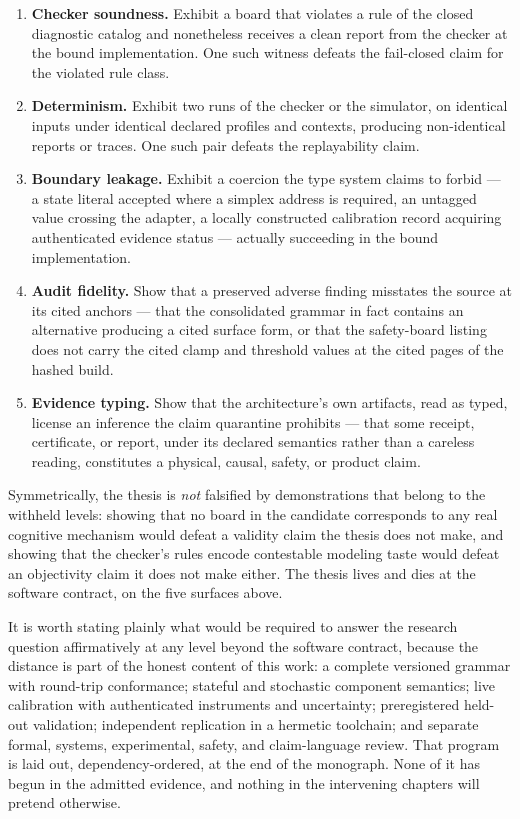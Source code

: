 \begin{enumerate}
\item \textbf{Checker soundness.} Exhibit a board that violates a rule of
the closed diagnostic catalog and nonetheless receives a clean report
from the checker at the bound implementation. One such witness defeats
the fail-closed claim for the violated rule class.
\item \textbf{Determinism.} Exhibit two runs of the checker or the
simulator, on identical inputs under identical declared profiles and
contexts, producing non-identical reports or traces. One such pair
defeats the replayability claim.
\item \textbf{Boundary leakage.} Exhibit a coercion the type system
claims to forbid --- a state literal accepted where a simplex address is
required, an untagged value crossing the adapter, a locally constructed
calibration record acquiring authenticated evidence status --- actually
succeeding in the bound implementation.
\item \textbf{Audit fidelity.} Show that a preserved adverse finding
misstates the source at its cited anchors --- that the consolidated
grammar in fact contains an alternative producing a cited surface form,
or that the safety-board listing does not carry the cited clamp and
threshold values at the cited pages of the hashed build.
\item \textbf{Evidence typing.} Show that the architecture's own
artifacts, read as typed, license an inference the claim quarantine
prohibits --- that some receipt, certificate, or report, under its
declared semantics rather than a careless reading, constitutes a
physical, causal, safety, or product claim.
\end{enumerate}

Symmetrically, the thesis is \emph{not} falsified by demonstrations that
belong to the withheld levels: showing that no board in the candidate
corresponds to any real cognitive mechanism would defeat a validity
claim the thesis does not make, and showing that the checker's rules
encode contestable modeling taste would defeat an objectivity claim it
does not make either. The thesis lives and dies at the software
contract, on the five surfaces above.

It is worth stating plainly what would be required to answer the research
question affirmatively at any level beyond the software contract, because
the distance is part of the honest content of this work: a complete
versioned grammar with round-trip conformance; stateful and stochastic
component semantics; live calibration with authenticated instruments and
uncertainty; preregistered held-out validation; independent replication in
a hermetic toolchain; and separate formal, systems, experimental, safety,
and claim-language review. That program is laid out, dependency-ordered, at
the end of the monograph. None of it has begun in the admitted evidence,
and nothing in the intervening chapters will pretend otherwise.

